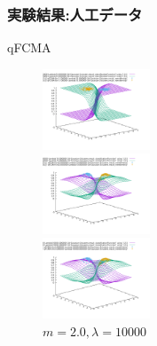 \documentclass[13pt,dvipdfmx]{beamer}
\begin{document}
\begin{frame}\frametitle{実験結果:人工データ}
  \begin{block}{qFCMA}
   \begin{figure}[htbp]
 \begin{minipage}{0.32\hsize}
  \begin{center}
   \includegraphics[width=32mm]{qFCMA-Em11-Lambda10.png}
  \end{center}
  \captionsetup{labelformat=empty,labelsep=none}
  \caption{$m=1.1, \lambda=10.0$}
  \label{fig:one}
 \end{minipage}
 \begin{minipage}{0.32\hsize}
  \begin{center}
   \includegraphics[width=32mm]{qFCMA-Em2-Lambda10.png}
  \end{center}
  \captionsetup{labelformat=empty,labelsep=none}
  \caption{$m=2.0, \lambda=10.0$}
  \label{fig:two}
 \end{minipage}
 \begin{minipage}{0.32\hsize}
  \begin{center}
   \includegraphics[width=32mm]{qFCMA-Em2-Lambda10000.png}
  \end{center}
  \captionsetup{labelformat=empty,labelsep=none}
  \caption{$m=2.0, \lambda=10000$}
  \label{fig:three}
 \end{minipage}
\end{figure}
 \end{block}
\end{frame}
\end{document}
